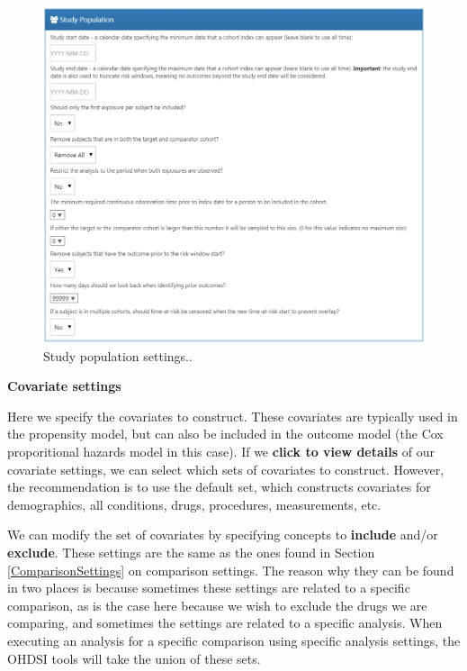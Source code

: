 \documentclass[11pt]{book}
\begin{document}
\begin{figure}

{\centering \includegraphics[width=1\linewidth]{images/PopulationLevelEstimation/studyPopulation} 

}

\caption{Study population settings..}\label{fig:studyPopulation}
\end{figure}

\textbf{Covariate settings}

Here we specify the covariates to construct. These covariates are
typically used in the propensity model, but can also be included in the
outcome model (the Cox proporitional hazards model in this case). If we
\textbf{click to view details} of our covariate settings, we can select
which sets of covariates to construct. However, the recommendation is to
use the default set, which constructs covariates for demographics, all
conditions, drugs, procedures, measurements, etc.

We can modify the set of covariates by specifying concepts to
\textbf{include} and/or \textbf{exclude}. These settings are the same as
the ones found in Section \ref{ComparisonSettings} on comparison
settings. The reason why they can be found in two places is because
sometimes these settings are related to a specific comparison, as is the
case here because we wish to exclude the drugs we are comparing, and
sometimes the settings are related to a specific analysis. When
executing an analysis for a specific comparison using specific analysis
settings, the OHDSI tools will take the union of these sets.
\end{document}
